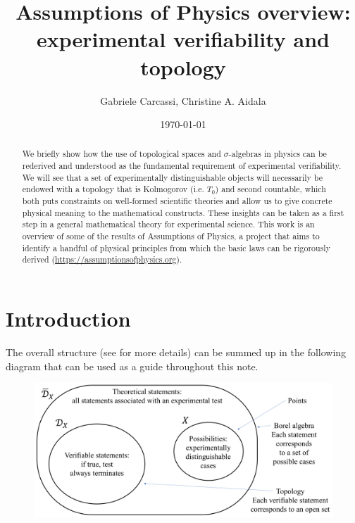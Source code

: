 \documentclass[10pt,twocolumn, nofootinbib]{revtex4-1}
\begin{document}
\title{Assumptions of Physics overview: \\
	experimental verifiability and topology }
\author{Gabriele Carcassi, Christine A. Aidala}

\date{\today}


\begin{abstract}
We briefly show how the use of topological spaces and $\sigma$-algebras in physics can be rederived and understood as the fundamental requirement of experimental verifiability. We will see that a set of experimentally distinguishable objects will necessarily be endowed with a topology that is Kolmogorov (i.e. $T_0$) and second countable, which both puts constraints on well-formed scientific theories and allow us to give concrete physical meaning to the mathematical constructs. These insights can be taken as a first step in a general mathematical theory for experimental science. This work is an overview of some of the results of Assumptions of Physics, a project that aims to identify a handful of physical principles from which the basic laws can be rigorously derived  (\url{https://assumptionsofphysics.org}).
\end{abstract}

\maketitle

\section{Introduction}

The overall structure (see \cite{AoPBook} for more details) can be summed up in the following diagram that can be used as a guide throughout this note.

\begin{figure}[h]
	\includegraphics[width=\columnwidth]{Diagram.png}
\end{figure}
\end{document}
